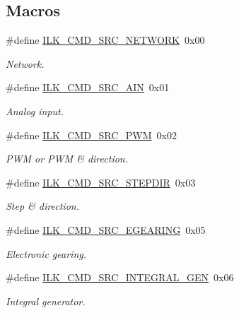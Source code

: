 \subsection*{Macros}
\begin{DoxyCompactItemize}
\item 
\#define \hyperlink{group__IL__CONST__CMD__SRC_ga88919277ef4cb64e612b18356061b87d}{I\+L\+K\+\_\+\+C\+M\+D\+\_\+\+S\+R\+C\+\_\+\+N\+E\+T\+W\+O\+RK}~0x00
\begin{DoxyCompactList}\small\item\em Network. \end{DoxyCompactList}\item 
\#define \hyperlink{group__IL__CONST__CMD__SRC_gaef878333a1356fde2b0534a169b93978}{I\+L\+K\+\_\+\+C\+M\+D\+\_\+\+S\+R\+C\+\_\+\+A\+IN}~0x01
\begin{DoxyCompactList}\small\item\em Analog input. \end{DoxyCompactList}\item 
\#define \hyperlink{group__IL__CONST__CMD__SRC_ga354c3281eb53b704f8fb7a6ec62a88c6}{I\+L\+K\+\_\+\+C\+M\+D\+\_\+\+S\+R\+C\+\_\+\+P\+WM}~0x02
\begin{DoxyCompactList}\small\item\em P\+WM or P\+WM \& direction. \end{DoxyCompactList}\item 
\#define \hyperlink{group__IL__CONST__CMD__SRC_ga65139db060bb9ccf75324070aac63635}{I\+L\+K\+\_\+\+C\+M\+D\+\_\+\+S\+R\+C\+\_\+\+S\+T\+E\+P\+D\+IR}~0x03
\begin{DoxyCompactList}\small\item\em Step \& direction. \end{DoxyCompactList}\item 
\#define \hyperlink{group__IL__CONST__CMD__SRC_ga23b5f07af7a7285c8e7cf0d371586f1d}{I\+L\+K\+\_\+\+C\+M\+D\+\_\+\+S\+R\+C\+\_\+\+E\+G\+E\+A\+R\+I\+NG}~0x05
\begin{DoxyCompactList}\small\item\em Electronic gearing. \end{DoxyCompactList}\item 
\#define \hyperlink{group__IL__CONST__CMD__SRC_gaf24cb62945a45167b7edb440559baab4}{I\+L\+K\+\_\+\+C\+M\+D\+\_\+\+S\+R\+C\+\_\+\+I\+N\+T\+E\+G\+R\+A\+L\+\_\+\+G\+EN}~0x06
\begin{DoxyCompactList}\small\item\em Integral generator. \end{DoxyCompactList}\end{DoxyCompactItemize}


